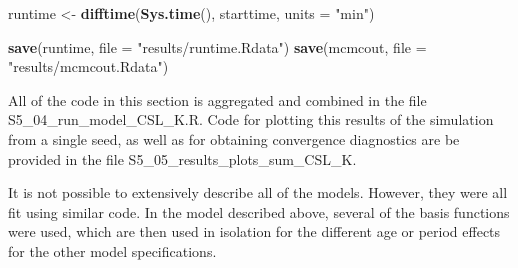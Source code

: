 \documentclass[11pt,]{article}
\newenvironment{Shaded}{\begin{snugshade}}{\end{snugshade}}
\newcommand{\KeywordTok}[1]{\textcolor[rgb]{0.13,0.29,0.53}{\textbf{#1}}}
\newcommand{\DataTypeTok}[1]{\textcolor[rgb]{0.13,0.29,0.53}{#1}}
\newcommand{\StringTok}[1]{\textcolor[rgb]{0.31,0.60,0.02}{#1}}
\newcommand{\NormalTok}[1]{#1}
\begin{document}
\begin{Shaded}
\begin{Highlighting}[]
\NormalTok{runtime <-}\StringTok{ }\KeywordTok{difftime}\NormalTok{(}\KeywordTok{Sys.time}\NormalTok{(),}
\NormalTok{                    starttime,}
                    \DataTypeTok{units =} \StringTok{"min"}\NormalTok{)}

\KeywordTok{save}\NormalTok{(runtime, }\DataTypeTok{file =} \StringTok{"results/runtime.Rdata"}\NormalTok{)}
\KeywordTok{save}\NormalTok{(mcmcout, }\DataTypeTok{file =} \StringTok{"results/mcmcout.Rdata"}\NormalTok{)}
\end{Highlighting}
\end{Shaded}

All of the code in this section is aggregated and combined in the file
S5\_04\_run\_model\_CSL\_K.R. Code for plotting this results of the
simulation from a single seed, as well as for obtaining convergence
diagnostics are be provided in the file
S5\_05\_results\_plots\_sum\_CSL\_K.

It is not possible to extensively describe all of the models. However,
they were all fit using similar code. In the model described above,
several of the basis functions were used, which are then used in
isolation for the different age or period effects for the other model
specifications.
\end{document}
